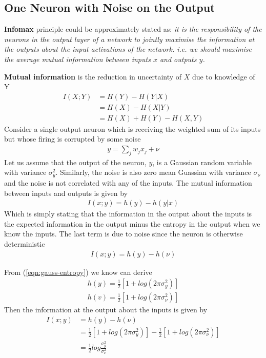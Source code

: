 \documentclass[../../main.tex]{subfiles}
\numberwithin{equation}{section}
\begin{document}
\subsection{One Neuron with Noise on the Output}
\textbf{Infomax} principle could be approximately stated as: \textit{it is the responsibility of the neurons in the output layer of a network to jointly maximise the information at the outputs about the input activations of the network. i.e. we should maximise the average mutual information between inputs $x$ and outputs $y$.} 

\textbf{Mutual information} is the reduction in uncertainty of $X$ due to knowledge of Y
\begin{align*}
    I(X;Y)&=H(Y)-H(Y|X)\\
          &=H(X)-H(X|Y)\\
          &=H(X)+H(Y)-H(X, Y)
\end{align*}
Consider a single output neuron which is receiving the weighted sum of its inputs but whose firing is corrupted by some noise
\begin{align}
    y = \sum\limits_j w_jx_j + \nu
\end{align}
Let us assume that the output of the neuron, $y$, is a Gaussian random variable with variance $\sigma_y^2$. Similarly, the noise is also zero mean Guassian with variance $\sigma_{\nu}$ and the noise is not correlated with any of the inputs.
The mutual information between inputs and outputs is given by
\begin{align}
    I(x; y)=h(y)-h(y|x)
\end{align}
Which is simply stating that the information in the output about the inputs is the expected information in the output minus the entropy in the output when we know the inputs. The last term is due to noise since the neuron is otherwise deterministic
\begin{align}
    I(x;y) = h(y)-h(\nu)
\end{align}

From (\ref{eqn:gauss-entropy}) we know can derive
\begin{align*}
    h(y)=\frac{1}{2}[1+log(2\pi \sigma_y^2)] \\
    h(v)=\frac{1}{2}[1+log(2\pi\sigma_{\nu}^2)]
\end{align*}
Then the information at the output about the inputs is given by
\begin{align*}
    I(x;y)&=h(y)-h(\nu)\\
    &=\frac{1}{2}[1+log(2\pi \sigma_y^2)] - \frac{1}{2}[1+log(2\pi \sigma_{\nu}^2)]\\
    &=\frac{1}{2}log\frac{\sigma_y^2}{\sigma_{\nu}^2}
\end{align*}
\end{document}
